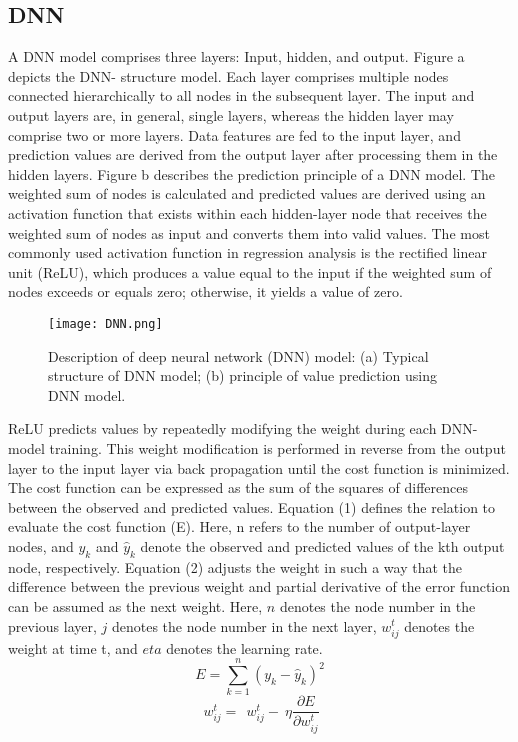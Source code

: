 \documentclass{ieeeojies}
\begin{document}
\subsection{DNN}
A DNN model comprises three layers: Input, hidden, and output. Figure a depicts the DNN- structure model. Each layer comprises multiple nodes connected hierarchically to all nodes in the subsequent layer. The input and output layers are, in general, single layers, whereas the hidden layer may comprise two or more layers. Data features are fed to the input layer, and prediction values are derived from the output layer after processing them in the hidden layers. Figure b describes the prediction principle of a DNN model. The weighted sum of nodes is calculated and predicted values are derived using an activation function that exists within each hidden-layer node that receives the weighted sum of nodes as input and converts them into valid values. The most commonly used activation function in regression analysis is the rectified linear unit (ReLU), which produces a value equal to the input if the weighted sum of nodes exceeds or equals zero; otherwise, it yields a value of zero.\\
\begin{figure} [H]
    \centering
    \texttt{[image: DNN.png]}
    \caption{Description of deep neural network (DNN) model: 
    (a) Typical structure of DNN model; 
    (b) principle of value prediction using DNN model.}
    \label{fig:enter-label}
\end{figure}
ReLU predicts values by repeatedly modifying the weight during each DNN-model training. This weight modification is performed in reverse from the output layer to the input layer via back propagation until the cost function is minimized. The cost function can be expressed as the sum of the squares of differences between the observed and predicted values. Equation (1) defines the relation to evaluate the cost function (E). Here, n refers to the number of output-layer nodes, and $y_k$ and ${\hat{y}}_k$ denote the observed and predicted values of the kth output node, respectively. Equation (2) adjusts the weight in such a way that the difference between the previous weight and partial derivative of the error function can be assumed as the next weight. Here, $n$ denotes the node number in the previous layer, $j$ denotes the node number in the next layer, $w_{ij}^t$ denotes the weight at time t, and $eta$ denotes the learning rate. \cite{nguyen5}\\
\begin{equation}
    E = \displaystyle \sum_{k=1}^{n}\left(y_k-{\hat{y}}_k\right)^2
\end{equation}
\begin{equation}
    \ w_{ij}^t=\ \ w_{ij}^t-\ \eta\frac{\partial E}{\partial w_{ij}^t}
\end{equation}
\end{document}
